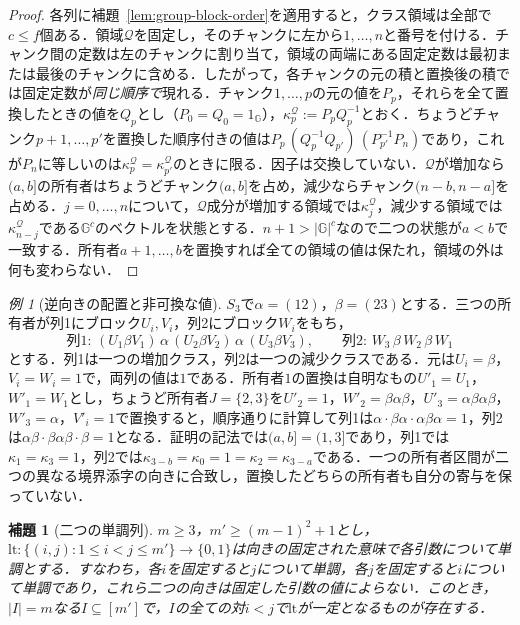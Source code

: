 \documentclass[11pt,a4paper]{ltjsarticle}
\numberwithin{equation}{section}
\theoremstyle{plain}
\newtheorem{lemma}[theorem]{補題}
\theoremstyle{definition}
\theoremstyle{remark}
\newtheorem{example}[theorem]{例}
\begin{document}
\begin{proof}
各列に補題~\ref{lem:group-block-order}を適用すると，クラス領域は全部で$c\le f$個ある．領域$\mathcal Q$を固定し，そのチャンクに左から$1,\ldots,n$と番号を付ける．チャンク間の定数は左のチャンクに割り当て，領域の両端にある固定定数は最初または最後のチャンクに含める．したがって，各チャンクの元の積と置換後の積では固定定数が\emph{同じ順序で}現れる．チャンク$1,\ldots,p$の元の値を$P_p$，それらを全て置換したときの値を$Q_p$とし（$P_0=Q_0=1_{\mathbb G}$），$\kappa^{\mathcal Q}_p:=P_pQ_p^{-1}$とおく．ちょうどチャンク$p+1,\ldots,p'$を置換した順序付きの値は$P_p\,(Q_p^{-1}Q_{p'})\,(P_{p'}^{-1}P_n)$であり，これが$P_n$に等しいのは$\kappa^{\mathcal Q}_p=\kappa^{\mathcal Q}_{p'}$のときに限る．因子は交換していない．$\mathcal Q$が増加なら$(a,b]$の所有者はちょうどチャンク$(a,b]$を占め，減少ならチャンク$(n-b,n-a]$を占める．$j=0,\ldots,n$について，$\mathcal Q$成分が増加する領域では$\kappa^{\mathcal Q}_j$，減少する領域では$\kappa^{\mathcal Q}_{n-j}$である${\mathbb G}^c$のベクトルを状態とする．$n+1>|{\mathbb G}|^c$なので二つの状態が$a<b$で一致する．所有者$a+1,\ldots,b$を置換すれば全ての領域の値は保たれ，領域の外は何も変わらない．
\end{proof}

\begin{example}[逆向きの配置と非可換な値]
\label{ex:nonabelian-reverse-owner}
$S_3$で$\alpha=(12)$，$\beta=(23)$とする．三つの所有者が列1にブロック$U_i,V_i$，列2にブロック$W_i$をもち，
\[
 \text{列1: }(U_1\beta V_1)\,\alpha\,(U_2\beta V_2)\,\alpha\,(U_3\beta V_3),\qquad
 \text{列2: }W_3\,\beta\,W_2\,\beta\,W_1
\]
とする．列1は一つの増加クラス，列2は一つの減少クラスである．元は$U_i=\beta$，$V_i=W_i=1$で，両列の値は$1$である．所有者$1$の置換は自明なもの$U'_1=U_1$，$W'_1=W_1$とし，ちょうど所有者$J=\{2,3\}$を$U'_2=1$，$W'_2=\beta\alpha\beta$，$U'_3=\alpha\beta\alpha\beta$，$W'_3=\alpha$，$V'_i=1$で置換すると，順序通りに計算して列1は$\alpha\cdot\beta\alpha\cdot\alpha\beta\alpha=1$，列2は$\alpha\beta\cdot\beta\alpha\beta\cdot\beta=1$となる．証明の記法では$(a,b]=(1,3]$であり，列1では$\kappa_1=\kappa_3=1$，列2では$\kappa_{3-b}=\kappa_0=1=\kappa_2=\kappa_{3-a}$である．一つの所有者区間が二つの異なる境界添字の向きに合致し，置換したどちらの所有者も自分の寄与を保っていない．
\end{example}

\begin{lemma}[二つの単調列]
\label{lem:two-sequence}
$m\ge3$，$m'\ge(m-1)^2+1$とし，$\mathrm{lt}:\{(i,j):1\le i<j\le m'\}\to\{0,1\}$は向きの固定された意味で各引数について単調とする．すなわち，各$i$を固定すると$j$について単調，各$j$を固定すると$i$について単調であり，これら二つの向きは固定した引数の値によらない．このとき，$|I|=m$なる$I\subseteq[m']$で，$I$の全ての対$i<j$で$\mathrm{lt}$が一定となるものが存在する．
\end{lemma}
\end{document}
